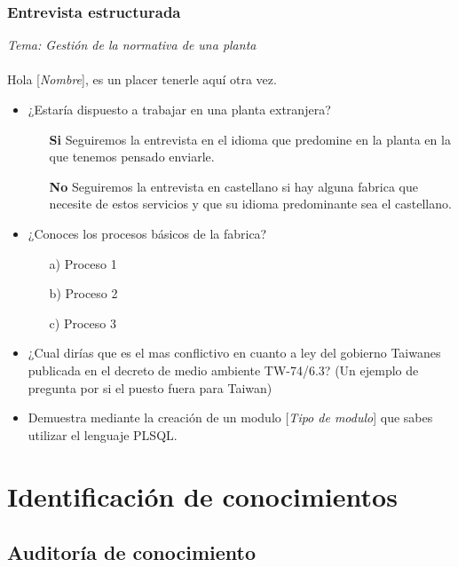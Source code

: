 \documentclass[twoside]{article}
\begin{document}
\subsubsection{Entrevista estructurada}
\textit{Tema: Gestión de la normativa de una planta}\\\\
Hola [\textit{Nombre}], es un placer tenerle aquí otra vez.

\begin{itemize}
		\item ¿Estaría dispuesto a trabajar en una planta extranjera?
		\begin{itemize}
			\item[\textbf{Si}] Seguiremos la entrevista en el idioma que predomine en la planta en la que tenemos pensado enviarle.
			\item[\textbf{No}] Seguiremos la entrevista en castellano si hay alguna fabrica que necesite de estos servicios y que su idioma predominante sea el castellano.
		\end{itemize}
	\item ¿Conoces los procesos básicos de la fabrica?
	\begin{itemize}
		\item[a)] Proceso 1
		\item[b)] Proceso 2
		\item[c)] Proceso 3
	\end{itemize}
	
	\item ¿Cual dirías que es el mas conflictivo en cuanto a ley del gobierno Taiwanes publicada en el decreto de medio ambiente TW-74/6.3? (Un ejemplo de pregunta por si el puesto fuera para Taiwan)
	\item Demuestra mediante la creación de un modulo  [\textit{Tipo de modulo}] que sabes utilizar el lenguaje PLSQL.

\end{itemize}


\newpage

\section{Identificación de conocimientos}

\subsection{Auditoría de conocimiento}
\end{document}

